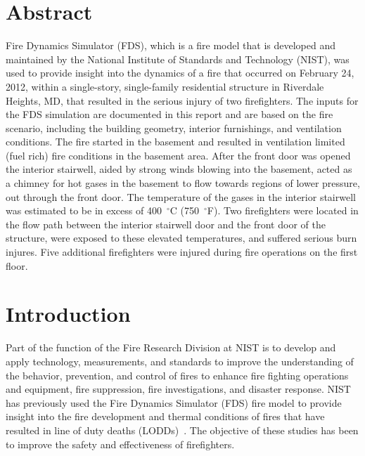 \documentclass[12pt,oneside]{book}
\begin{document}
\chapter*{\centering Abstract}
Fire Dynamics Simulator (FDS), which is a fire model that is developed and maintained by the National Institute of Standards and Technology (NIST), was used to provide insight into the dynamics of a fire that occurred on February 24, 2012, within a single-story, single-family residential structure in Riverdale Heights, MD, that resulted in the serious injury of two firefighters. The inputs for the FDS simulation are documented in this report and are based on the fire scenario, including the building geometry, interior furnishings, and ventilation conditions. The fire started in the basement and resulted in ventilation limited (fuel rich) fire conditions in the basement area. After the front door was opened the interior stairwell, aided by strong winds blowing into the basement, acted as a chimney for hot gases in the basement to flow towards regions of lower pressure, out through the front door. The temperature of the gases in the interior stairwell was estimated to be in excess of 400~$^{\circ}$C (750~$^{\circ}$F). Two firefighters were located in the flow path between the interior stairwell door and the front door of the structure, were exposed to these elevated temperatures, and suffered serious burn injures. Five additional firefighters were injured during fire operations on the first floor.

\chapter{Introduction}
\setcounter{page}{1}
Part of the function of the Fire Research Division at NIST is to develop and apply technology, measurements, and standards to improve the understanding of the behavior, prevention, and control of fires to enhance fire fighting operations and equipment, fire suppression, fire investigations, and disaster response. NIST has previously used the Fire Dynamics Simulator (FDS) fire model to provide insight into the fire development and thermal conditions of fires that have resulted in line of duty deaths (LODDs)~\cite{Madrzykowski:1,Iowa,Texas,Bryner:Charleston,barowy:texas,Weinschenk:Chicago,Overholt:San_Francisco}. The objective of these studies has been to improve the safety and effectiveness of firefighters.
\end{document}
